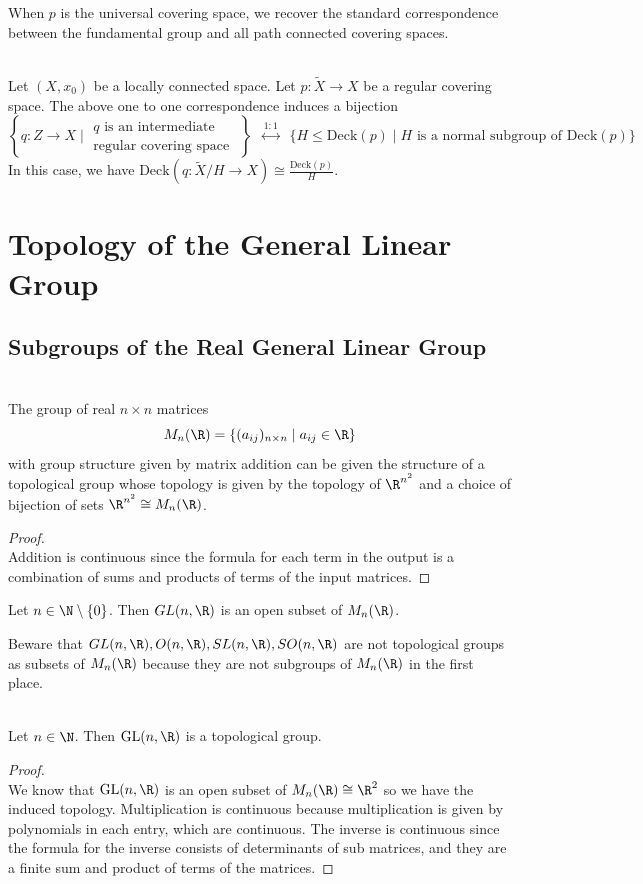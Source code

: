 \documentclass[a4paper]{article}
\begin{document}
When $p$ is the universal covering space, we recover the standard correspondence between the fundamental group and all path connected covering spaces. 

\begin{prp}{}{}\\
Let $(X,x_0)$ be a locally connected space. Let $p:\widetilde{X}\to X$ be a regular covering space. The above one to one correspondence induces a bijection $$\left\{q:Z\to X\;|\;\substack{q\text{ is an intermediate}\\\text{regular covering space }}\right\}\;\;\overset{1:1}{\longleftrightarrow}\;\;\{H\leq\text{Deck}(p)\;|\;H\text{ is a normal subgroup of Deck}(p)\}$$ In this case, we have $\text{Deck}(q:\widetilde{X}/H\to X)\cong\frac{\text{Deck}(p)}{H}$. 
\end{prp}

\pagebreak
\section{Topology of the General Linear Group}
\subsection{Subgroups of the Real General Linear Group}
\begin{prp}{}{}\\
The group of real $n\times n$ matrices $$M_n(\R)=\{(a_{ij})_{n\times n}\;|\;a_{ij}\in\R\}$$ with group structure given by matrix addition can be given the structure of a topological group whose topology is given by the topology of $\R^{n^2}$ and a choice of bijection of sets $\R^{n^2}\cong M_n(\R)$. 
\begin{proof}\\
Addition is continuous since the formula for each term in the output is a combination of sums and products of terms of the input matrices. 
\end{proof}
\end{prp}

\begin{prp}{}{} Let $n\in\N\setminus\{0\}$. Then $GL(n,\R)$ is an open subset of $M_n(\R)$. 
\end{prp}

Beware that $GL(n,\R),O(n,\R),SL(n,\R),SO(n,\R)$ are not topological groups as subsets of $M_n(\R)$ because they are not subgroups of $M_n(\R)$ in the first place. 

\begin{prp}{}{}\\
Let $n\in\N$. Then $\text{GL}(n,\R)$ is a topological group. 
\begin{proof}\\
We know that $\text{GL}(n,\R)$ is an open subset of $M_n(\R)\cong\R^2$ so we have the induced topology. Multiplication is continuous because multiplication is given by polynomials in each entry, which are continuous. The inverse is continuous since the formula for the inverse consists of determinants of sub matrices, and they are a finite sum and product of terms of the matrices. 
\end{proof}
\end{prp}
\end{document}
